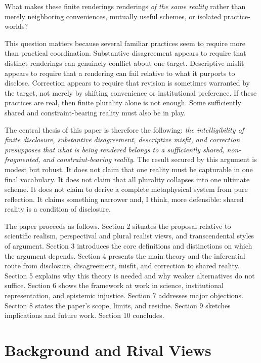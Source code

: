 \documentclass[11pt]{article}
\renewcommand{\emph}[1]{\textit{#1}}
\begin{document}
What makes these finite renderings renderings \emph{of the same reality} rather than merely neighboring conveniences, mutually useful schemes, or isolated practice-worlds?

This question matters because several familiar practices seem to require more than practical coordination. Substantive disagreement appears to require that distinct renderings can genuinely conflict about one target. Descriptive misfit appears to require that a rendering can fail relative to what it purports to disclose. Correction appears to require that revision is sometimes warranted by the target, not merely by shifting convenience or institutional preference. If these practices are real, then finite plurality alone is not enough. Some sufficiently shared and constraint-bearing reality must also be in play.

The central thesis of this paper is therefore the following: \emph{the intelligibility of finite disclosure, substantive disagreement, descriptive misfit, and correction presupposes that what is being rendered belongs to a sufficiently shared, non-fragmented, and constraint-bearing reality}. The result secured by this argument is modest but robust. It does not claim that one reality must be capturable in one final vocabulary. It does not claim that all plurality collapses into one ultimate scheme. It does not claim to derive a complete metaphysical system from pure reflection. It claims something narrower and, I think, more defensible: shared reality is a condition of disclosure.

The paper proceeds as follows. Section 2 situates the proposal relative to scientific realism, perspectival and plural realist views, and transcendental styles of argument. Section 3 introduces the core definitions and distinctions on which the argument depends. Section 4 presents the main theory and the inferential route from disclosure, disagreement, misfit, and correction to shared reality. Section 5 explains why this theory is needed and why weaker alternatives do not suffice. Section 6 shows the framework at work in science, institutional representation, and epistemic injustice. Section 7 addresses major objections. Section 8 states the paper's scope, limits, and residue. Section 9 sketches implications and future work. Section 10 concludes.

\section{Background and Rival Views}
\end{document}

